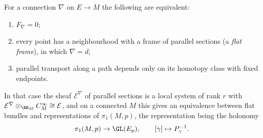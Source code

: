 \begin{theorem}\label{connections:theorem-flat-local-systems}
For a connection $\nabla$ on $E \to M$ the following are equivalent:
\begin{enumerate}
\item $F_\nabla = 0$;
\item every point has a neighbourhood with a frame of parallel sections (a \emph{flat frame}), in which $\nabla = d$;
\item parallel transport along a path depends only on its homotopy class with fixed endpoints.
\end{enumerate}
In that case the sheaf $\mathcal{E}^\nabla$ of parallel sections is a local system of rank $r$ with $\mathcal{E}^\nabla \otimes_{\RR_M} C^\infty_M \cong \mathcal{E}$, and on a connected $M$ this gives an
equivalence between flat bundles and representations of $\pi_1(M, p)$, the representation being the holonomy
\[
\pi_1(M, p) \to \GL(E_p), \qquad [\gamma] \mapsto P_\gamma^{-1}.
\]
\end{theorem}

